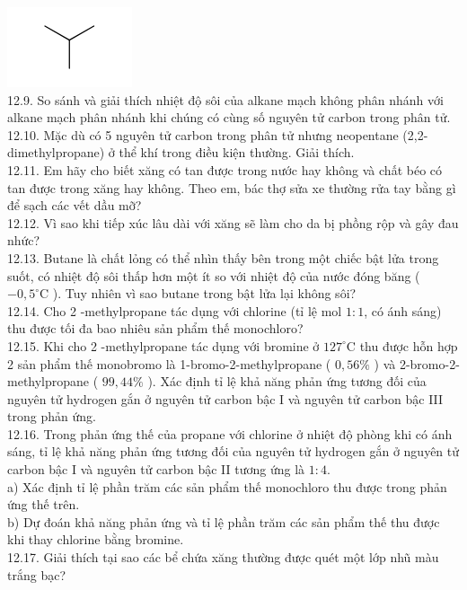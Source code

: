 \documentclass[10pt]{article}
\begin{document}
\includegraphics{smile-99446cb39b7095191a86025f043f4edd5a4ed665}\\
12.9. So sánh và giải thích nhiệt độ sôi của alkane mạch không phân nhánh với alkane mạch phân nhánh khi chúng có cùng số nguyên tử carbon trong phân tử.\\
12.10. Mặc dù có 5 nguyên tử carbon trong phân tử nhưng neopentane (2,2-dimethylpropane) ở thể khí trong điều kiện thường. Giải thích.\\
12.11. Em hãy cho biết xăng có tan được trong nước hay không và chất béo có tan được trong xăng hay không. Theo em, bác thợ sửa xe thường rửa tay bằng gì để sạch các vết dầu mỡ?\\
12.12. Vì sao khi tiếp xúc lâu dài với xăng sẽ làm cho da bị phồng rộp và gây đau nhức?\\
12.13. Butane là chất lỏng có thể nhìn thấy bên trong một chiếc bật lửa trong suốt, có nhiệt độ sôi thấp hơn một ít so với nhiệt độ của nước đóng băng ( $-0,5^{\circ} \mathrm{C}$ ). Tuy nhiên vì sao butane trong bật lửa lại không sôi?\\
12.14. Cho 2 -methylpropane tác dụng với chlorine (tỉ lệ mol $1: 1$, có ánh sáng) thu được tối đa bao nhiêu sản phẩm thế monochloro?\\
12.15. Khi cho 2 -methylpropane tác dụng với bromine ở $127^{\circ} \mathrm{C}$ thu được hỗn hợp 2 sản phẩm thế monobromo là 1-bromo-2-methylpropane ( $0,56 \%$ ) và 2-bromo-2-methylpropane ( $99,44 \%$ ). Xác định tỉ lệ khả năng phản ứng tương đối của nguyên tử hydrogen gắn ở nguyên tử carbon bậc I và nguyên tử carbon bậc III trong phản ứng.\\
12.16. Trong phản ứng thế của propane với chlorine ở nhiệt độ phòng khi có ánh sáng, tỉ lệ khả năng phản ứng tương đối của nguyên tử hydrogen gắn ở nguyên tử carbon bậc I và nguyên tử carbon bậc II tương ứng là $1: 4$.\\
a) Xác định tỉ lệ phần trăm các sản phẩm thế monochloro thu được trong phản ứng thế trên.\\
b) Dự đoán khả năng phản ứng và tỉ lệ phần trăm các sản phẩm thế thu được khi thay chlorine bằng bromine.\\
12.17. Giải thích tại sao các bể chứa xăng thường được quét một lớp nhũ màu trắng bạc?\\
\end{document}
